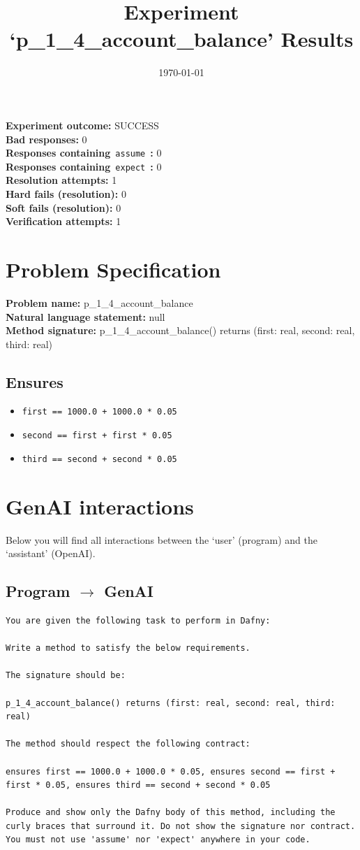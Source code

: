 \documentclass{article}
\begin{document}
\title{Experiment `p\_1\_4\_account\_balance' Results}
\author{\today}
\date{}
\maketitle
\textbf{Experiment outcome: }SUCCESS
\\\textbf{Bad responses: }0
\\\textbf{Responses containing}~\texttt{assume}~\textbf{: }0
\\\textbf{Responses containing}~\texttt{expect}~\textbf{: }0
\\\textbf{Resolution attempts: }1
\\\textbf{Hard fails (resolution): }0
\\\textbf{Soft fails (resolution): }0
\\\textbf{Verification attempts: }1
\section*{Problem Specification}
\textbf{Problem name: }p\_1\_4\_account\_balance
\\\textbf{Natural language statement: }null
\\\textbf{Method signature: }p\_1\_4\_account\_balance() returns (first: real, second: real, third: real)
\subsection*{Ensures}
\begin{itemize}
\item \texttt{first == 1000.0 + 1000.0 * 0.05}
\item \texttt{second == first + first * 0.05}
\item \texttt{third == second + second * 0.05}
\end{itemize}
\clearpage
\section*{GenAI interactions}
Below you will find all interactions between the `user' (program) and the `assistant' (OpenAI).
\subsection*{Program $\rightarrow$ GenAI}
\begin{lstlisting}
You are given the following task to perform in Dafny:

Write a method to satisfy the below requirements.

The signature should be:

p_1_4_account_balance() returns (first: real, second: real, third: real)

The method should respect the following contract:

ensures first == 1000.0 + 1000.0 * 0.05, ensures second == first + first * 0.05, ensures third == second + second * 0.05

Produce and show only the Dafny body of this method, including the curly braces that surround it. Do not show the signature nor contract. You must not use 'assume' nor 'expect' anywhere in your code.
\end{lstlisting}
\end{document}
